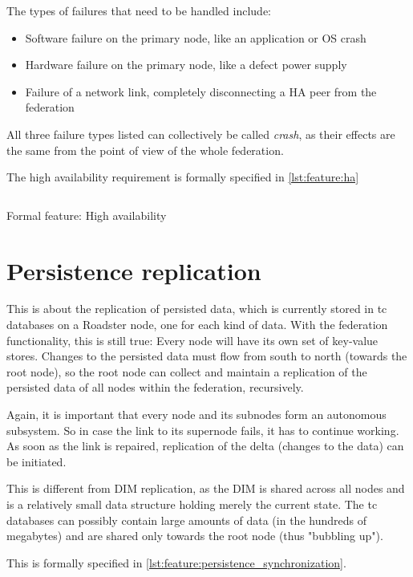 The types of failures that need to be handled include:
\begin{itemize}
	\item Software failure on the primary node, like an application or OS crash
	\item Hardware failure on the primary node, like a defect power supply
	\item Failure of a network link, completely disconnecting a HA peer from the federation
\end{itemize}

All three failure types listed can collectively be called \emph{crash},
as their effects are the same from the point of view of the whole federation.

The high availability requirement is formally specified in \autoref{lst:feature:ha}

\begin{listing}
	\inputminted{Gherkin}{listings/features/high_availability.feature}
	\caption{Formal feature: High availability}
	\label{lst:feature:ha}
\end{listing}

\section{Persistence replication}
This is about the replication of persisted data, which is currently stored
in \gls{tc} databases on a Roadster node, one for each kind of data. With the federation functionality, this is
still true: Every node will have its own set of key-value stores. Changes to the persisted
data must flow from south to north (towards the root node), so the root
node can collect and maintain a replication of the persisted data of all
nodes within the federation, recursively.

Again, it is important that every node and its subnodes form an autonomous subsystem. So
in case the link to its supernode fails, it has to continue working. As soon as
the link is repaired, replication of the delta (changes to the data) can
be initiated.

This is different from \gls{DIM} replication, as the DIM is shared across
all nodes and is a relatively small data structure holding merely the current state. The \gls{tc} databases
can possibly contain large amounts of data (in the hundreds of megabytes) and
are shared only towards the root node (thus "bubbling up").

This is formally specified in \autoref{lst:feature:persistence_synchronization}.

